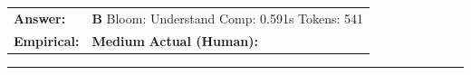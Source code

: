 \documentclass[9pt]{article}
\begin{document}
\begin{tabular}{@{}l p{10.5cm}@{}}
\textbf{Answer:} & \textbf{B} \hspace{1em} Bloom: Understand \hspace{1em} Comp: 0.591s \hspace{1em} Tokens: 541 \\
\textbf{Empirical:} & \textbf{Medium} \hspace{1em} \textbf{Actual (Human):} \underline{\hspace{5cm}}
\end{tabular}

\vspace{0.2cm}
\rule{\textwidth}{0.4pt}
\vspace{0.2cm}
\end{document}
